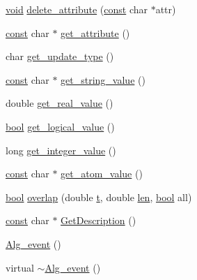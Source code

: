 \begin{DoxyCompactItemize}
\item 
\hyperlink{sound_8c_ae35f5844602719cf66324f4de2a658b3}{void} \hyperlink{class_alg__event_a61ede8f16a06daac148375447975fd37}{delete\+\_\+attribute} (\hyperlink{getopt1_8c_a2c212835823e3c54a8ab6d95c652660e}{const} char $\ast$attr)
\item 
\hyperlink{getopt1_8c_a2c212835823e3c54a8ab6d95c652660e}{const} char $\ast$ \hyperlink{class_alg__event_ae2b65f882af7d067bd2ea64f8f85433a}{get\+\_\+attribute} ()
\item 
char \hyperlink{class_alg__event_aec80dc5f09019f34c9950e7143e552f0}{get\+\_\+update\+\_\+type} ()
\item 
\hyperlink{getopt1_8c_a2c212835823e3c54a8ab6d95c652660e}{const} char $\ast$ \hyperlink{class_alg__event_a5090975f84d811129cfa9265c39b21b0}{get\+\_\+string\+\_\+value} ()
\item 
double \hyperlink{class_alg__event_ad183f6597f6821e0e24a2a3f9223cec3}{get\+\_\+real\+\_\+value} ()
\item 
\hyperlink{mac_2config_2i386_2lib-src_2libsoxr_2soxr-config_8h_abb452686968e48b67397da5f97445f5b}{bool} \hyperlink{class_alg__event_a8ab7e05b0df429fc5aa059d6bf4098a8}{get\+\_\+logical\+\_\+value} ()
\item 
long \hyperlink{class_alg__event_a84e37c4a8b613a9fba71e7e641a44c5c}{get\+\_\+integer\+\_\+value} ()
\item 
\hyperlink{getopt1_8c_a2c212835823e3c54a8ab6d95c652660e}{const} char $\ast$ \hyperlink{class_alg__event_a22de071475ea1dabcd32a916e05abde7}{get\+\_\+atom\+\_\+value} ()
\item 
\hyperlink{mac_2config_2i386_2lib-src_2libsoxr_2soxr-config_8h_abb452686968e48b67397da5f97445f5b}{bool} \hyperlink{class_alg__event_ac52292020ddd25d5ffb867aa5a8f5e57}{overlap} (double \hyperlink{octave__test_8m_aaccc9105df5383111407fd5b41255e23}{t}, double \hyperlink{lib_2expat_8h_af86d325fecfc8f47b61fbf5a5146f582}{len}, \hyperlink{mac_2config_2i386_2lib-src_2libsoxr_2soxr-config_8h_abb452686968e48b67397da5f97445f5b}{bool} all)
\item 
\hyperlink{getopt1_8c_a2c212835823e3c54a8ab6d95c652660e}{const} char $\ast$ \hyperlink{class_alg__event_a63f0c2ccda392a55c5a714980d104756}{Get\+Description} ()
\item 
\hyperlink{class_alg__event_a0ceaa9849360ad9c6ab94a67e4743d1c}{Alg\+\_\+event} ()
\item 
virtual \hyperlink{class_alg__event_a71dad19a8f7cf2cb6869e0daae52d8c3}{$\sim$\+Alg\+\_\+event} ()
\end{DoxyCompactItemize}
